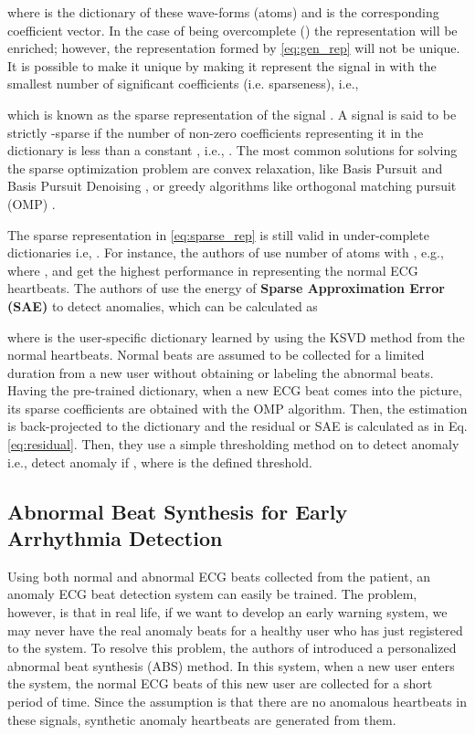 \documentclass[journal,transmag]{IEEEtran}
\begin{document}
where  is the dictionary of these wave-forms (atoms) and  is the corresponding coefficient vector. In the case of being overcomplete () the representation will be enriched; however, the representation formed by \eqref{eq:gen_rep} will not be unique. It is possible to make it unique by making it represent the signal in  with the smallest number of significant coefficients (i.e. sparseness), i.e., 

which is known as the sparse representation of the signal . A signal is said to be strictly -sparse if the number of non-zero coefficients representing it in the dictionary is less than a constant , i.e., . The most common solutions for solving the sparse optimization problem are convex relaxation, like Basis Pursuit and Basis Pursuit Denoising \cite{BP}, or greedy algorithms like orthogonal matching pursuit (OMP) \cite{OMP1}.

The sparse representation in \eqref{eq:sparse_rep} is still valid in under-complete dictionaries i.e, . For instance, the authors of \cite{carrera2016ecg} use  number of atoms with , e.g.,  where , and get the highest performance in representing the normal ECG heartbeats. The authors of \cite{carrera2016ecg} use the energy of \textbf{Sparse Approximation Error (SAE)} to detect anomalies, which can be calculated as

where  is the user-specific dictionary learned by using the KSVD method \cite{KSVD} from the normal heartbeats. Normal beats are assumed to be collected for a limited duration from a new user without obtaining or labeling the abnormal beats. Having the pre-trained dictionary, when a new ECG beat  comes into the picture, its sparse coefficients are obtained with the OMP algorithm. Then, the estimation  is back-projected to the dictionary and the residual or SAE is calculated as in Eq. \eqref{eq:residual}. Then, they use a simple thresholding method on  to detect anomaly i.e., detect anomaly if , where  is the defined threshold.   


\subsection{Abnormal Beat Synthesis for Early Arrhythmia Detection}
\label{sec:ABS}
Using both normal and abnormal ECG beats collected from the patient, an anomaly ECG beat detection system can easily be trained. The problem, however, is that in real life, if we want to develop an early warning system, we may never have the real anomaly beats for a healthy user who has just registered to the system. To resolve this problem, the authors of \cite{kiranyaz2017personalized} introduced a personalized abnormal beat synthesis (ABS) method. In this system, when a new user enters the system, the normal ECG beats of this new user are collected for a short period of time. Since the assumption is that there are no anomalous heartbeats in these signals, synthetic anomaly heartbeats are generated from them.
\end{document}
